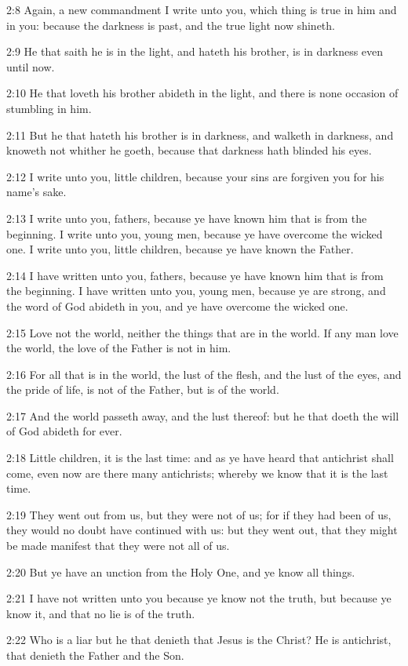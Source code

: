 2:8 Again, a new commandment I write unto you, which thing is true in
him and in you: because the darkness is past, and the true light now
shineth.

2:9 He that saith he is in the light, and hateth his brother, is in
darkness even until now.

2:10 He that loveth his brother abideth in the light, and there is
none occasion of stumbling in him.

2:11 But he that hateth his brother is in darkness, and walketh in
darkness, and knoweth not whither he goeth, because that darkness hath
blinded his eyes.

2:12 I write unto you, little children, because your sins are forgiven
you for his name's sake.

2:13 I write unto you, fathers, because ye have known him that is from
the beginning. I write unto you, young men, because ye have overcome
the wicked one. I write unto you, little children, because ye have
known the Father.

2:14 I have written unto you, fathers, because ye have known him that
is from the beginning. I have written unto you, young men, because ye
are strong, and the word of God abideth in you, and ye have overcome
the wicked one.

2:15 Love not the world, neither the things that are in the world. If
any man love the world, the love of the Father is not in him.

2:16 For all that is in the world, the lust of the flesh, and the lust
of the eyes, and the pride of life, is not of the Father, but is of
the world.

2:17 And the world passeth away, and the lust thereof: but he that
doeth the will of God abideth for ever.

2:18 Little children, it is the last time: and as ye have heard that
antichrist shall come, even now are there many antichrists; whereby we
know that it is the last time.

2:19 They went out from us, but they were not of us; for if they had
been of us, they would no doubt have continued with us: but they went
out, that they might be made manifest that they were not all of us.

2:20 But ye have an unction from the Holy One, and ye know all things.

2:21 I have not written unto you because ye know not the truth, but
because ye know it, and that no lie is of the truth.

2:22 Who is a liar but he that denieth that Jesus is the Christ? He is
antichrist, that denieth the Father and the Son.

